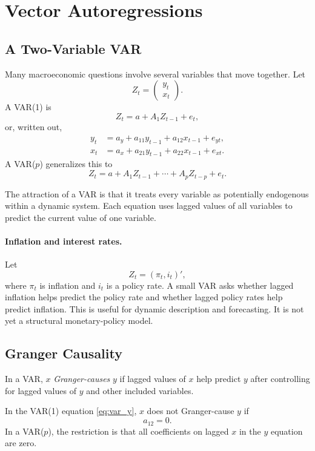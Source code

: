 \section{Vector Autoregressions}

\subsection{A Two-Variable VAR}
Many macroeconomic questions involve several variables that move together. Let
\[
Z_t=
\begin{pmatrix}
y_t\\
x_t
\end{pmatrix}.
\]
A VAR(1) is
\begin{equation}
Z_t=a+A_1Z_{t-1}+e_t,
\label{eq:var1}
\end{equation}
or, written out,
\begin{align}
y_t&=a_y+a_{11}y_{t-1}+a_{12}x_{t-1}+e_{yt}, \label{eq:var_y}\\
x_t&=a_x+a_{21}y_{t-1}+a_{22}x_{t-1}+e_{xt}. \label{eq:var_x}
\end{align}
A VAR($p$) generalizes this to
\[
Z_t=a+A_1Z_{t-1}+\cdots+A_pZ_{t-p}+e_t.
\]

The attraction of a VAR is that it treats every variable as potentially endogenous within a dynamic system. Each equation uses lagged values of all variables to predict the current value of one variable.

\paragraph{Inflation and interest rates.}
Let
\[
Z_t=(\pi_t,i_t)',
\]
where $\pi_t$ is inflation and $i_t$ is a policy rate. A small VAR asks whether lagged inflation helps predict the policy rate and whether lagged policy rates help predict inflation. This is useful for dynamic description and forecasting. It is not yet a structural monetary-policy model.

\subsection{Granger Causality}
\begin{defN}
In a VAR, $x$ \emph{Granger-causes} $y$ if lagged values of $x$ help predict $y$ after controlling for lagged values of $y$ and other included variables.
\end{defN}

In the VAR(1) equation \eqref{eq:var_y}, $x$ does not Granger-cause $y$ if
\[
a_{12}=0.
\]
In a VAR($p$), the restriction is that all coefficients on lagged $x$ in the $y$ equation are zero.

